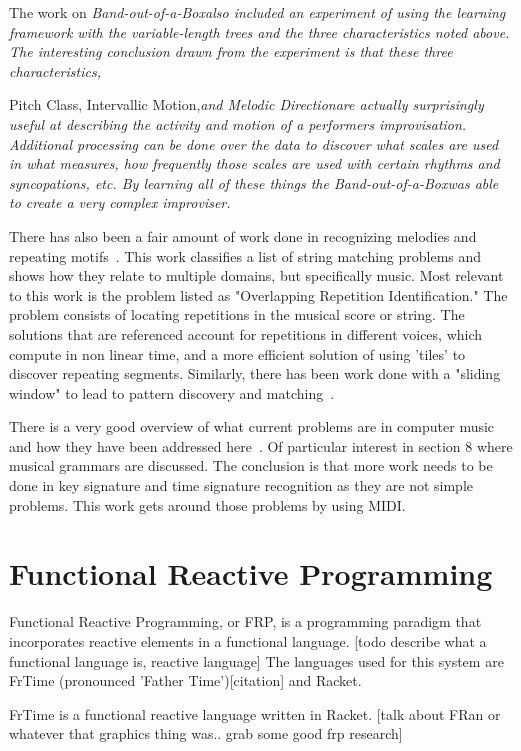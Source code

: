 \documentclass[12pt]{ucthesis}
\begin{document}
The work on \em{Band-out-of-a-Box}\em also included an experiment of using the learning framework with the variable-length trees and the three characteristics noted above. The interesting conclusion drawn from the experiment is that these three characteristics, \em{Pitch Class, Intervallic Motion,\em and  \em{Melodic Direction}\em are actually surprisingly useful at describing the activity and motion of a performers improvisation. Additional processing can be done over the data to discover what scales are used in what measures, how frequently those scales are used with certain rhythms and syncopations, etc. By learning all of these things the \em{Band-out-of-a-Box}\em was able to create a very complex improviser.

There has also been a fair amount of work done in recognizing melodies and repeating motifs~\cite{MelodicRecognition}. This work classifies a list of string matching problems and shows how they relate to multiple domains, but specifically music. Most relevant to this work is the problem listed as "Overlapping Repetition Identification." The problem consists of locating repetitions in the musical score or string. The solutions that are referenced account for repetitions in different voices, which compute in non linear time, and a more efficient solution of using 'tiles' to discover repeating segments. Similarly, there has been work done with a "sliding window" to lead to pattern discovery and matching~\cite{slidingWindow}.

There is a very good overview of what current problems are in computer music and how they have been addressed here~\cite{Gerhard}. Of particular interest in section 8 where musical grammars are discussed. The conclusion is that more work needs to be done in key signature and time signature recognition as they are not simple problems. This work gets around those problems by using MIDI.

\section{Functional Reactive Programming}
\label{rw:frp}

Functional Reactive Programming, or FRP, is a programming paradigm that incorporates reactive elements in a functional language. [todo describe what a functional language is, reactive language] The languages used for this system are FrTime (pronounced 'Father Time')[citation] and Racket. 

FrTime is a functional reactive language written in Racket. [talk about FRan or whatever that graphics thing was.. grab some good frp research]

}
\end{document}

